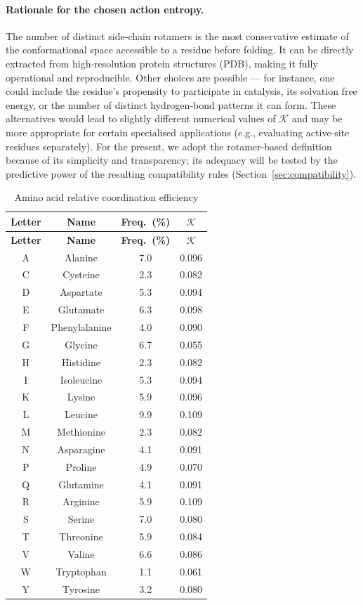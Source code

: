 \documentclass[12pt,a4paper]{article}
\newcommand{\REL}{\mathcal{K}}          %
\begin{document}
	\paragraph{Rationale for the chosen action entropy.}
	The number of distinct side‑chain rotamers is the most conservative estimate of the conformational space accessible to a residue before folding.
	It can be directly extracted from high‑resolution protein structures (PDB), making it fully operational and reproducible.
	Other choices are possible — for instance, one could include the residue's propensity to participate in catalysis, its solvation free energy, or the number of distinct hydrogen‑bond patterns it can form.
	These alternatives would lead to slightly different numerical values of \(\REL\) and may be more appropriate for certain specialised applications (e.g., evaluating active‑site residues separately).
	For the present, we adopt the rotamer‑based definition because of its simplicity and transparency; its adequacy will be tested by the predictive power of the resulting compatibility rules (Section~\ref{sec:compatibility}).
	
	\begin{longtable}{|c|c|c|c|}
		\caption{Amino acid relative coordination efficiency}\label{tab:amino}\\
		\hline
		\textbf{Letter} & \textbf{Name} & \textbf{Freq.\ (\%)} & \(\REL\) \\
		\hline
		\endfirsthead
		\hline
		\textbf{Letter} & \textbf{Name} & \textbf{Freq.\ (\%)} & \(\REL\) \\
		\hline
		\endhead
		\hline
		A & Alanine & 7.0 & 0.096 \\
		C & Cysteine & 2.3 & 0.082 \\
		D & Aspartate & 5.3 & 0.094 \\
		E & Glutamate & 6.3 & 0.098 \\
		F & Phenylalanine & 4.0 & 0.090 \\
		G & Glycine & 6.7 & 0.055 \\
		H & Histidine & 2.3 & 0.082 \\
		I & Isoleucine & 5.3 & 0.094 \\
		K & Lysine & 5.9 & 0.096 \\
		L & Leucine & 9.9 & 0.109 \\
		M & Methionine & 2.3 & 0.082 \\
		N & Asparagine & 4.1 & 0.091 \\
		P & Proline & 4.9 & 0.070 \\
		Q & Glutamine & 4.1 & 0.091 \\
		R & Arginine & 5.9 & 0.109 \\
		S & Serine & 7.0 & 0.080 \\
		T & Threonine & 5.9 & 0.084 \\
		V & Valine & 6.6 & 0.086 \\
		W & Tryptophan & 1.1 & 0.061 \\
		Y & Tyrosine & 3.2 & 0.080 \\
		\hline
	\end{longtable}
	
\end{document}
